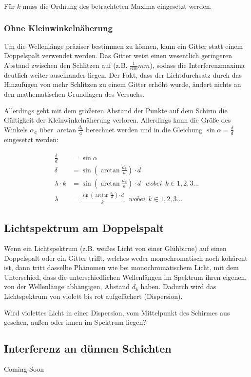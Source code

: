 Für $k$ muss die Ordnung des betrachteten Maxima eingesetzt werden.
		

\subsubsection{Ohne Kleinwinkelnäherung}

Um die Wellenlänge präziser bestimmen zu können, kann ein Gitter statt einem Doppelspalt verwendet werden. Das Gitter weist einen wesentlich geringeren Abstand zwischen den Schlitzen auf (z.B. $\frac{1}{600}mm$), sodass die Interferenzmaxima deutlich weiter auseinander liegen. Der Fakt, dass der Lichtdurchsatz durch das Hinzufügen von mehr Schlitzen zu einem Gitter erhöht wurde, ändert nichts an den mathematischen Grundlagen des Versuchs.
	
Allerdings geht mit dem größeren Abstand der Punkte auf dem Schirm die Gültigkeit der Kleinwinkelnäherung verloren. Allerdings kann die Größe des Winkels $\alpha_a$ über $\arctan{\frac{d_k}{a}}$ berechnet werden und in die Gleichung $\sin{\alpha} = \frac{\delta}{d}$ eingesetzt werden:
	
\begin{align}
\begin{split}
		\frac{\delta}{d} &= \sin{\alpha} \\
		 \delta &= \sin{(\arctan{\frac{d_k}{a}})} \cdot d \\
		\lambda \cdot k &= \sin{(\arctan{\frac{d_k}{a}})} \cdot d \ \ \ wobei \ \ k \in 1,2,3... \\
		\lambda &= \frac{\sin{(\arctan{\frac{d_k}{a}})} \cdot d}{k} \ \ \ wobei \ \ k \in 1,2,3...
\end{split}
\end{align}


\subsection{Lichtspektrum am Doppelspalt}

Wenn ein Lichtspektrum (z.B. weißes Licht von einer Glühbirne) auf einen Doppelspalt oder ein Gitter trifft, welches weder monochromatisch noch kohärent ist, dann tritt dasselbe Phänomen wie bei monochromatischem Licht, mit dem Unterschied, dass die unterschiedlichen Wellenlängen im Spektrum ihren eigenen, von der Wellenlänge abhängigen, Abstand $d_k$ haben. Dadurch wird das Lichtspektrum von violett bis rot aufgefächert (Dispersion).

\begin{Aufgabe}
Wird violettes Licht in einer Dispersion, vom Mittelpunkt des Schirmes aus gesehen, außen oder innen im Spektrum liegen?
\end{Aufgabe}


\subsection{Interferenz an dünnen Schichten}

Coming Soon